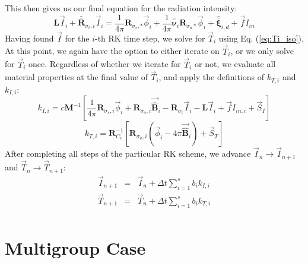 \documentclass[11pt]{article}
\newcommand{\benum}{\begin{equation}}
\newcommand{\eenum}{\end{equation}}
\newcommand{\bea}{\begin{eqnarray*}}
\newcommand{\eea}{\end{eqnarray*}}
\newcommand{\eqt}[1]{Eq. (\ref{#1})}
\newcommand{\M}{\ensuremath{ \mathbf M}}
\newcommand{\R}{\ensuremath{{\mathbf R}}}
\begin{document}
This then gives us our final equation for the radiation intensity:
\benum
\mathbf{ L} \vec{I}_i + \bar{\bar{\mathbf R}}_{\sigma_t,i}\vec{I}_i = \frac{1}{4\pi}\R_{\sigma_s,*}\vec{\phi}_i + \frac{1}{4\pi}\bar{\bar{\mathbf \nu}}_i \R_{\sigma_a*}\vec{\phi}_i + \bar{\bar{\mathbf \xi}}_{i,d} + \vec{f}I_{in} 
\eenum
Having found $\vec{I}$ for the $i$-th RK time step, we solve for $\vec{T}_i$ using \eqt{eq:Ti_iso}.  At this point, we again have the option to either iterate on $\vec{T}_i$, or we only solve for $\vec{T}_i$ once.  Regardless of whether we iterate for $\vec{T}_i$ or not, we evaluate all material properties at the final value of $\vec{T}_i$, and apply the definitions of $k_{T,i}$ and $k_{I,i}$:
\benum
k_{I,i} = c\M^{-1}\left[   
\frac{1}{4\pi}\R_{\sigma_s,i}\vec{\phi}_i + \R_{\sigma_a,i}\vec{\widehat{\mathbf B}}_i- \R_{\sigma_t} \vec{I}_i - \mathbf{L}\vec{I}_i  + \vec{f} I_{in,i} + \vec{S}_I
\right]
\eenum
\benum
k_{T,i} = \R_{C_v}^{-1}\left[
\R_{\sigma_a,i} \left(\vec{\phi}_i - 4\pi\vec{\widehat{\mathbf B}}_i \right) + \vec{S}_T
\right]
\eenum
After completing all steps of the particular RK scheme, we advance $\vec{I}_n \to \vec{I}_{n+1}$ and $\vec{T}_n \to \vec{T}_{n+1}$:
\bea
\vec{I}_{n+1} &=& \vec{I}_n + \Delta t \sum_{i=1}^s{b_i k_{I,i}} \\ 
\vec{T}_{n+1} &=& \vec{T}_n + \Delta t \sum_{i=1}^s{b_i k_{T,i}} \\ 
\eea 

\section{Multigroup Case}
\end{document}
